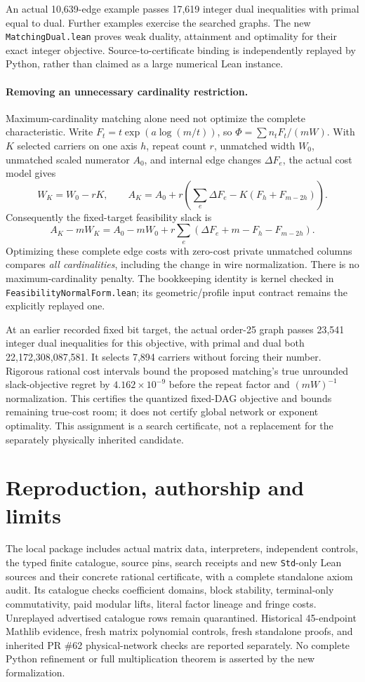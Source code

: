 \documentclass[11pt]{article}
\begin{document}
An actual 10,639-edge example passes 17,619 integer dual inequalities with
primal equal to dual. Further examples exercise the searched graphs.
The new \texttt{MatchingDual.lean} proves weak duality, attainment and
optimality for their exact integer objective. Source-to-certificate binding
is independently replayed by Python, rather than claimed as a large
numerical Lean instance.

\paragraph{Removing an unnecessary cardinality restriction.}
Maximum-cardinality matching alone need not optimize the complete
characteristic. Write $F_t=t\exp(a\log(m/t))$, so
$\Phi=\sum n_tF_t/(mW)$. With $K$ selected carriers on one axis $h$,
repeat count $r$, unmatched width $W_0$, unmatched scaled numerator $A_0$,
and internal edge changes $\Delta F_e$, the actual cost model gives
\[
 W_K=W_0-rK,\qquad
 A_K=A_0+r\left(\sum_e\Delta F_e-K(F_h+F_{m-2h})\right).
\]
Consequently the fixed-target feasibility slack is
\begin{equation}\label{eq:allcard}
 A_K-mW_K=A_0-mW_0+
 r\sum_e\left(\Delta F_e+m-F_h-F_{m-2h}\right).
\end{equation}
Optimizing these complete edge costs with zero-cost private unmatched
columns compares \emph{all cardinalities}, including the change in wire
normalization. There is no maximum-cardinality penalty. The bookkeeping
identity is kernel checked in \texttt{FeasibilityNormalForm.lean}; its
geometric/profile input contract remains the explicitly replayed one.

At an earlier recorded fixed bit target, the actual order-25 graph passes 23,541
integer dual inequalities for this objective, with primal and dual both
22,172,308,087,581. It selects 7,894 carriers without forcing their number.
Rigorous rational cost intervals bound the proposed matching's true
unrounded slack-objective regret by $4.162\times10^{-9}$ before the repeat
factor and $(mW)^{-1}$ normalization. This certifies the quantized fixed-DAG
objective and bounds remaining true-cost room; it does not certify global
network or exponent optimality. This assignment is a search certificate,
not a replacement for the separately physically inherited candidate.

\section{Reproduction, authorship and limits}
The local package includes actual matrix data, interpreters, independent
controls, the typed finite catalogue, source pins, search receipts and new
\texttt{Std}-only Lean sources and their concrete rational certificate,
with a complete standalone axiom audit. Its catalogue checks coefficient domains,
block stability, terminal-only commutativity, paid modular lifts, literal
factor lineage and fringe costs. Unreplayed advertised catalogue rows remain
quarantined. Historical 45-endpoint Mathlib evidence, fresh matrix polynomial
controls, fresh standalone proofs, and inherited PR \#62 physical-network checks are
reported separately. No complete Python refinement or full multiplication
theorem is asserted by the new formalization.
\end{document}
